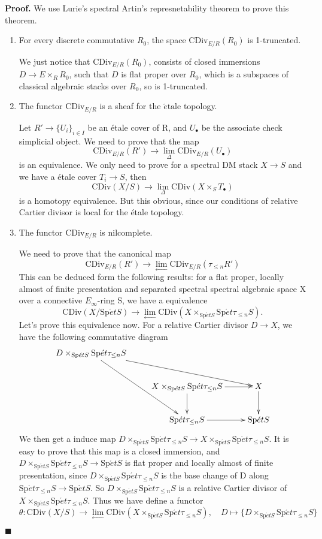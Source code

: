 \documentclass[12pt]{article}
\theoremstyle{thry}
\renewenvironment{proof}
{\par \noindent \textbf{Proof.}}
{ \par \hfill $\blacksquare$ \quad \par }
\def  \etale    {\acute{e}\text{tale}}
\def  \CDiv     {\mathrm{CDiv}}
\def  \leftlim  {\underset{\longleftarrow}{\lim}}
\def  \Spet     {\mathrm{Sp}\acute{e}t}
\begin{document}
\begin{proof}
We use Lurie's spectral Artin's represnetability theorem to prove this theorem. 
\begin{enumerate}
	\item For  every discrete commutative $R_0$, the space $\CDiv_{E/R}(R_0)$ is 1-truncated.
	 
	 We just notice that $\CDiv_{E/R}(R_0)$, consists of closed immersions $D \to E \times_RR_0$, such that $D$ is flat proper over $R_0$, which is a subspaces of  classical algebraic stacks over $R_0$, so is 1-truncated.
	 \item  The functor $\CDiv_{E/R}$ is a sheaf for the $\etale$ topology.
	 
	 Let $R' \to \{{U_i}\}_{i \in I}$ be an \'etale cover of R, and $U_{\bullet}$ be the associate check simplicial object. We need to prove that the map
	 $$
     \CDiv_{E/R}(R')   \to   \lim_{\Delta} \CDiv_{E/R} ( U_{\bullet})
	 $$
	 is an equivalence. We only need to prove  for a spectral DM stack $X \to S$ and we have a \'etale cover $T_i \to S$, then
	 $$
	  \CDiv(X/S) \to   \lim_{\Delta} \CDiv( X \times_S T_{\bullet})
	 $$
	 is a homotopy equivalence. But this obvious, since our conditions of relative Cartier divisor is local for the \'etale topology.
	 \item   The functor $\CDiv_{E/R}$ is nilcomplete.
	 
     We need to prove that the canonical map
     $$
     \CDiv_{E/R}(R') \to  \underset{\longleftarrow}{\lim}\CDiv_{E/R}(\tau_{\leq n} R')
     $$ 
      This   can be deduced form  the following  results: for a  flat proper, locally almost of finite presentation and separated spectral spectral algebraic space X over a connective $E_{\infty}$-ring S,  we have a equivalence
      $$
      \CDiv(X/\Spet S) \to \leftlim\CDiv(X \times_{\Spet S}  \Spet \tau_{\leq n} S).
      $$
      Let's prove this equivalence now. For a relative Cartier divisor $D \to X$,  we have the following commutative diagram
      $$
      \xymatrix{
          D \times_{\Spet S} \Spet \tau_{\leq n}S \ar[rrd] \ar[rdd]  &&\\
       &     X \times_{\Spet S}  \Spet \tau_{\leq n} S \ar[r]  \ar[d]  &  X \ar[d]  \\
       &     \Spet \tau_{\leq n} S \ar[r]       &   \Spet S   \\   
      }
      $$
      We then get a induce map $D \times_{\Spet S}\Spet \tau_{\leq n}S \to  X \times_{\Spet S} \Spet \tau_{\leq n } S  $. It is easy to prove that this map is a closed immersion, and $ D \times_{\Spet S} \Spet \tau_{\leq n}S \to \Spet S$ is flat proper and  locally almost of finite presentation, since $D \times_{\Spet S} \Spet \tau_{\leq n}S$ is the base change of D along $ \Spet \tau_{\leq n} S \to  \Spet S$.  So $D \times_{\Spet S} \Spet \tau_{\leq n}S$ is a relative Cartier divisor of $X \times_{\Spet S}  \Spet\tau_{\leq n} S$. Thus we have define a functor
      $$
       \theta:\CDiv(X/S) \to \leftlim\CDiv(X \times_{\Spet S}  \Spet \tau_{\leq n} S), \quad D \mapsto  \{D \times_{\Spet S} \Spet \tau_{\leq n}S\}
      $$
      

\end{enumerate}
\end{proof}
\end{document}
